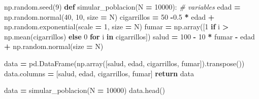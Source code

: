 \documentclass[
  a4paper,
  DIV=11,
  numbers=noendperiod]{scrreprt}
\newenvironment{Shaded}{\begin{snugshade}}{\end{snugshade}}
\newcommand{\CommentTok}[1]{\textcolor[rgb]{0.56,0.35,0.01}{\textit{#1}}}
\newcommand{\ControlFlowTok}[1]{\textcolor[rgb]{0.13,0.29,0.53}{\textbf{#1}}}
\newcommand{\DecValTok}[1]{\textcolor[rgb]{0.00,0.00,0.81}{#1}}
\newcommand{\FloatTok}[1]{\textcolor[rgb]{0.00,0.00,0.81}{#1}}
\newcommand{\KeywordTok}[1]{\textcolor[rgb]{0.13,0.29,0.53}{\textbf{#1}}}
\newcommand{\NormalTok}[1]{#1}
\newcommand{\OperatorTok}[1]{\textcolor[rgb]{0.81,0.36,0.00}{\textbf{#1}}}
\newcommand{\StringTok}[1]{\textcolor[rgb]{0.31,0.60,0.02}{#1}}
\begin{document}
\begin{Shaded}
\begin{Highlighting}[numbers=left,,]
\NormalTok{np.random.seed(}\DecValTok{9}\NormalTok{)}
\KeywordTok{def}\NormalTok{ simular\_poblacion(N }\OperatorTok{=} \DecValTok{10000}\NormalTok{):}
    \CommentTok{\# variables}
\NormalTok{    edad }\OperatorTok{=}\NormalTok{ np.random.normal(}\DecValTok{40}\NormalTok{, }\DecValTok{10}\NormalTok{, size }\OperatorTok{=}\NormalTok{ N)}
\NormalTok{    cigarrillos }\OperatorTok{=} \DecValTok{50} \OperatorTok{{-}}\FloatTok{0.5} \OperatorTok{*}\NormalTok{ edad }\OperatorTok{+}\NormalTok{ np.random.exponential(scale }\OperatorTok{=} \DecValTok{1}\NormalTok{, size }\OperatorTok{=}\NormalTok{ N)}
\NormalTok{    fumar }\OperatorTok{=}\NormalTok{ np.array([}\DecValTok{1} \ControlFlowTok{if}\NormalTok{ i }\OperatorTok{\textgreater{}}\NormalTok{ np.mean(cigarrillos) }\ControlFlowTok{else} \DecValTok{0} \ControlFlowTok{for}\NormalTok{ i }\KeywordTok{in}\NormalTok{ cigarrillos])}
\NormalTok{    salud }\OperatorTok{=} \DecValTok{100} \OperatorTok{{-}} \DecValTok{10} \OperatorTok{*}\NormalTok{ fumar  }\OperatorTok{{-}}\NormalTok{ edad }\OperatorTok{+}\NormalTok{ np.random.normal(size }\OperatorTok{=}\NormalTok{ N)}

\NormalTok{    data }\OperatorTok{=}\NormalTok{ pd.DataFrame(np.array([salud, edad, cigarrillos, fumar]).transpose())}
\NormalTok{    data.columns }\OperatorTok{=}\NormalTok{ [}\StringTok{\textquotesingle{}salud\textquotesingle{}}\NormalTok{, }\StringTok{\textquotesingle{}edad\textquotesingle{}}\NormalTok{, }\StringTok{\textquotesingle{}cigarrillos\textquotesingle{}}\NormalTok{, }\StringTok{\textquotesingle{}fumar\textquotesingle{}}\NormalTok{]}
    \ControlFlowTok{return}\NormalTok{ data}

\NormalTok{data }\OperatorTok{=}\NormalTok{ simular\_poblacion(N }\OperatorTok{=} \DecValTok{10000}\NormalTok{)}
\NormalTok{data.head()}
\end{Highlighting}
\end{Shaded}
\end{document}
